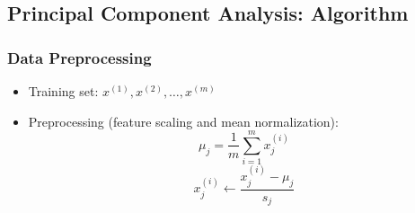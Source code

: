 \subsection{Principal Component Analysis: Algorithm}
    \subsubsection{Data Preprocessing}
        \begin{itemize}
            \item Training set: $x^{(1)}, x^{(2)}, \dots, x^{(m)}$
            \item Preprocessing (feature scaling and mean normalization):
                \[
                    \mu_j = \frac{1}{m} \sum_{i=1}^{m} x_j^{(i)}
                \] 
                \[
                    x_j^{(i)} \gets \frac{x_j^{(i)} - \mu_j}{s_j}
                \] 
       \end{itemize}

